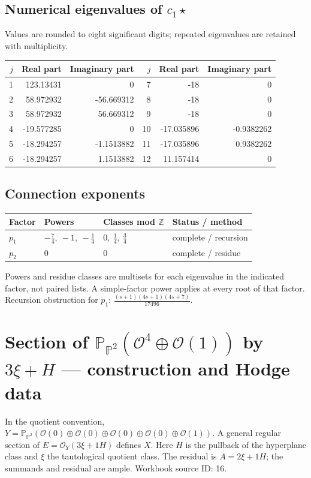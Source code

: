 \documentclass[10pt,a4paper]{article}
\begin{document}
\subsection*{Numerical eigenvalues of $c_1\star$}
Values are rounded to eight significant digits; repeated eigenvalues are retained with multiplicity.
\begin{center}\small\begin{tabular}{rrr@{\qquad}rrr}\toprule $j$ & Real part & Imaginary part & $j$ & Real part & Imaginary part\\\midrule
1 & 123.13431 & 0 & 7 & -18 & 0\\
2 & 58.972932 & -56.669312 & 8 & -18 & 0\\
3 & 58.972932 & 56.669312 & 9 & -18 & 0\\
4 & -19.577285 & 0 & 10 & -17.035896 & -0.9382262\\
5 & -18.294257 & -1.1513882 & 11 & -17.035896 & 0.9382262\\
6 & -18.294257 & 1.1513882 & 12 & 11.157414 & 0\\
\bottomrule\end{tabular}\end{center}
\subsection*{Connection exponents}
\begin{center}\begin{tabular}{llll}\toprule Factor & Powers & Classes mod $\mathbb Z$ & Status / method\\\midrule
$p_{1}$ & $- \frac{7}{4},\ -1,\ - \frac{1}{4}$ & $0,\ \frac{1}{4},\ \frac{3}{4}$ & complete / recursion\\
$p_{2}$ & $0$ & $0$ & complete / residue\\
\bottomrule\end{tabular}\end{center}
Powers and residue classes are multisets for each eigenvalue in the indicated factor, not paired lists. A simple-factor power applies at every root of that factor.
Recursion obstruction for $p_{1}$: $\frac{\left(s + 1\right) \left(4 s + 1\right) \left(4 s + 7\right)}{17496}$.
\clearpage\section*{Section of $\mathbb P_{\mathbb P^{2}}(\mathcal O^{4}\oplus \mathcal O(1))$ by $3\xi +H$ --- construction and Hodge data}\label{entry:PB5-016}
In the quotient convention, $Y=\mathbb P_{\mathbb P^{2}}(\mathcal O(0)\oplus\mathcal O(0)\oplus\mathcal O(0)\oplus\mathcal O(0)\oplus\mathcal O(1))$.
A general regular section of $E=\mathcal O_Y(3\xi+1H)$ defines $X$.
Here $H$ is the pullback of the hyperplane class and $\xi$ the tautological quotient class. The residual is $A=2\xi+1H$; the summands and residual are ample.
Workbook source ID: 16.
\end{document}
